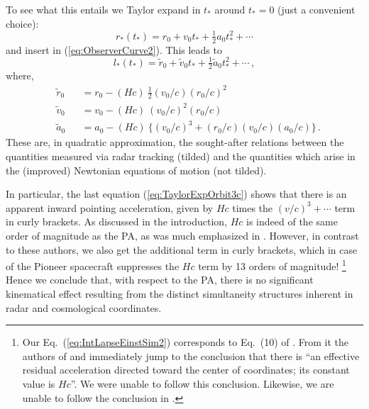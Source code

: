 \documentclass
[rmp,aps,twocolumn,showpacs,preprintnumbers,amsmath,amssymb]{revtex4}
\theoremstyle{plain}
\theoremstyle{definition}
\theoremstyle{remark}
\begin{document}
To see what this entails we Taylor expand in $t_*$ around $t_*=0$ 
(just a convenient choice): 
%
\begin{equation}\label{eq:TaylorExpOrbit1} 
  r_*(t_*) = r_0+v_0t_*+\tfrac{1}{2}a_0t_*^ 2 +\cdots
\end{equation}
and insert in (\ref{eq:ObserverCurve2}). This leads to 
%
\begin{equation}\label{eq:TaylorExpOrbit2} 
  l_*(t_*) = \tilde r_0+\tilde v_0t_*+\tfrac{1}{2}\tilde a_0t_*^ 2 +\cdots\,,
\end{equation}
where, 
%
\begin{subequations}\label{eq:TaylorExpOrbitAll}
\begin{alignat}{2}
\label{eq:TaylorExpOrbit3a}
  &\tilde r_0 &&= r_0-(Hc)\ \tfrac{1}{2}(v_0/c)(r_0/c)^2\\
\label{eq:TaylorExpOrbit3b}
  &\tilde v_0 &&= v_0-(Hc)\ (v_0/c)^2(r_0/c)\\
\label{eq:TaylorExpOrbit3c}
  &\tilde a_0 &&= a_0-(Hc)\ \bigl\{(v_0/c)^3+(r_0/c)(v_0/c)(a_0/c)\bigl\} \,. 
\end{alignat}
\end{subequations}
%
These are, in quadratic approximation, the sought-after relations 
between the quantities measured via radar tracking (tilded) and the 
quantities which arise in the (improved) Newtonian equations of motion 
(not tilded). 

In particular, the last equation (\ref{eq:TaylorExpOrbit3c}) shows that 
there is an apparent inward pointing acceleration, given by $Hc$ times the 
$(v/c)^3+\cdots$ term in curly brackets. As discussed in the introduction,
$Hc$ is indeed of the same order of magnitude as the PA, as was much
emphasized in \cite{Rosales.Sanchez-Gomez:1998,Rosales:2002}. 
However, in contrast to these authors, we also get the additional 
term in curly brackets, which in case of the Pioneer spacecraft suppresses 
the $Hc$ term by 13 orders of magnitude!%
\footnote{Our Eq.~(\ref{eq:IntLapseEinstSim2}) corresponds to Eq.~(10) of 
\cite{Rosales.Sanchez-Gomez:1998}. From it the authors of 
\cite{Rosales.Sanchez-Gomez:1998} and \cite{Rosales:2002} 
immediately jump to the conclusion that there is ``an effective 
residual acceleration directed toward the center of coordinates; 
its constant value is $Hc$''. We were unable to follow this 
conclusion. Likewise, we are unable to follow the conclusion in 
\cite{Fahr.Siewert:2008}.} Hence we conclude that, with respect to the 
PA, there is no significant kinematical effect resulting from the distinct 
simultaneity structures inherent in radar and cosmological coordinates. 
\end{document}
